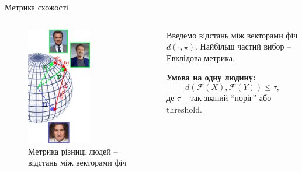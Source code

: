 \documentclass[xcolor={usenames,dvipsnames}]{beamer}
\begin{document}
    \begin{frame}{Метрика схожості}

    \begin{columns}
        \begin{column}{0.5\textwidth}
        \begin{figure}
        \centering
            \includegraphics[width=0.6\textwidth]{images/hypersphere_dist.png}
            \caption{Метрика різниці людей -- відстань між векторами фіч}
        \end{figure}
        \end{column}

        \begin{column}{0.5\textwidth}
            Введемо відстань між векторами фіч $d(\cdot,\star)$. Найбільш частий вибор -- Евклідова метрика. 
        
            \textbf{Умова на одну людину:}
            \begin{equation*}
                \boxed{d(\mathcal{F}(X),\mathcal{F}(Y)) \leq \tau},
            \end{equation*}
            де $\tau$ -- так званий ``поріг'' або threshold.
        \end{column}
    \end{columns}
    \end{frame}
\end{document}
